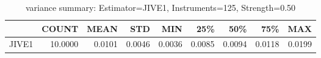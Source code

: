\begin{table}[ht]
\centering
\caption{variance summary: Estimator=JIVE1, Instruments=125, Strength=0.50}
\begin{tabular}{lrrrrrrrr}
\toprule
 & COUNT & MEAN & STD & MIN & 25\% & 50\% & 75\% & MAX \\
\midrule
JIVE1 & 10.0000 & 0.0101 & 0.0046 & 0.0036 & 0.0085 & 0.0094 & 0.0118 & 0.0199 \\
\bottomrule
\end{tabular}
\end{table}

